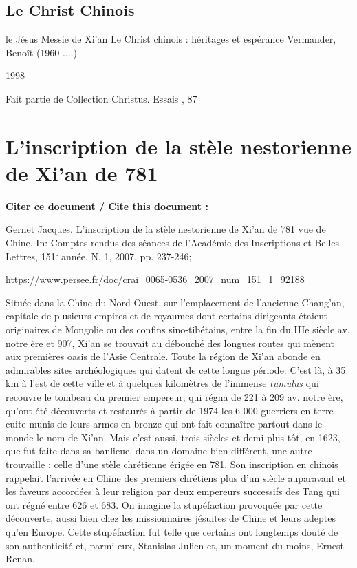 \subsection{Le Christ Chinois}
le Jésus Messie de Xi'an
Le Christ chinois : héritages et espérance
Vermander, Benoît (1960-....)

1998

Fait partie de
Collection Christus. Essais , 87


\section{L'inscription de la stèle nestorienne de Xi'an de 781}


\textbf{Citer ce document / Cite this document :}

Gernet Jacques. L'inscription de la stèle nestorienne de Xi'an de 781
vue de Chine. In: Comptes rendus des séances de l'Académie des
Inscriptions et Belles-Lettres, 151ᵉ année, N. 1, 2007. pp. 237-246;

\url{https://www.persee.fr/doc/crai_0065-0536_2007_num_151_1_92188}
 


Située dans la Chine du Nord-Ouest, sur l'emplacement de l'ancienne
Chang'an, capitale de plusieurs empires et de royaumes dont certains
dirigeants étaient originaires de Mongolie ou des confins
sino-tibétains, entre la fin du IIIe siècle av. notre ère et 907, Xi'an
se trouvait au débouché des longues routes qui mènent aux premières
oasis de l'Asie Centrale. Toute la région de Xi'an abonde en admirables
sites archéologiques qui datent de cette longue période. C'est là, à 35
km à l'est de cette ville et à quelques kilomètres de l'immense
\emph{tumulus} qui recouvre le tombeau du premier empereur, qui régna de
221 à 209 av. notre ère, qu'ont été découverts et restaurés à partir de
1974 les 6 000 guerriers en terre cuite munis de leurs armes en bronze
qui ont fait connaître partout dans le monde le nom de Xi'an. Mais c'est
aussi, trois siècles et demi plus tôt, en 1623, que fut faite dans sa
banlieue, dans un domaine bien différent, une autre trouvaille : celle
d'une stèle chrétienne érigée en 781. Son inscription en chinois
rappelait l'arrivée en Chine des premiers chrétiens plus d'un siècle
auparavant et les faveurs accordées à leur religion par deux empereurs
successifs des Tang qui ont régné entre 626 et 683. On imagine la
stupéfaction provoquée par cette découverte, aussi bien chez les
missionnaires jésuites de Chine et leurs adeptes qu'en Europe. Cette
stupéfaction fut telle que certains ont longtemps douté de son
authenticité et, parmi eux, Stanislas Julien et, un moment du moins,
Ernest Renan.



